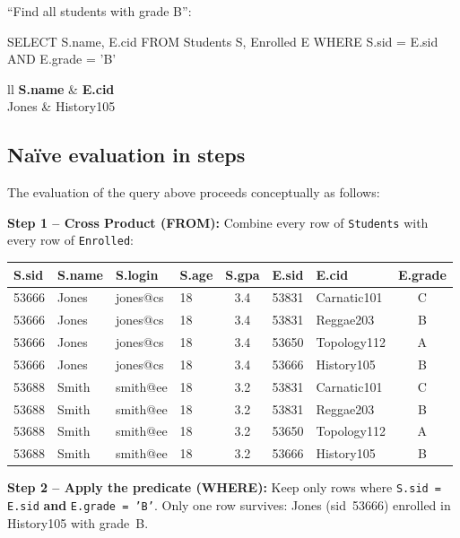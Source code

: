 \documentclass[../../dis.tex]{subfiles}
\begin{document}
``Find all students with grade B'':
\begin{sql}
    SELECT S.name, E.cid
    FROM Students S, Enrolled E
    WHERE S.sid = E.sid AND E.grade = 'B'
\end{sql}

\begin{dbtable}{}{ll}
\textbf{S.name} & \textbf{E.cid} \\ \hline
Jones & History105 \\
\end{dbtable}

\subsection{Na\"ive evaluation in steps}
The evaluation of the query above proceeds conceptually as follows:

\textbf{Step 1 -- Cross Product (FROM):}
Combine every row of \texttt{Students} with every row of \texttt{Enrolled}:

\begin{center}
\scriptsize
\begin{tabular}{|l|l|l|l|c|l|l|c|}
\hline
\rowcolor{DBHeaderBg}
\textbf{S.sid} & \textbf{S.name} & \textbf{S.login} & \textbf{S.age} & \textbf{S.gpa} & \textbf{E.sid} & \textbf{E.cid} & \textbf{E.grade} \\ \hline
53666 & Jones & jones@cs & 18 & 3.4 & 53831 & Carnatic101 & C \\ \hline
53666 & Jones & jones@cs & 18 & 3.4 & 53831 & Reggae203 & B \\ \hline
53666 & Jones & jones@cs & 18 & 3.4 & 53650 & Topology112 & A \\ \hline
53666 & Jones & jones@cs & 18 & 3.4 & 53666 & History105 & B \\ \hline
53688 & Smith & smith@ee & 18 & 3.2 & 53831 & Carnatic101 & C \\ \hline
53688 & Smith & smith@ee & 18 & 3.2 & 53831 & Reggae203 & B \\ \hline
53688 & Smith & smith@ee & 18 & 3.2 & 53650 & Topology112 & A \\ \hline
53688 & Smith & smith@ee & 18 & 3.2 & 53666 & History105 & B \\ \hline
\end{tabular}
\normalsize
\end{center}

\textbf{Step 2 -- Apply the predicate (WHERE):}
Keep only rows where \texttt{S.sid = E.sid} \textbf{and} \texttt{E.grade = 'B'}. Only one row survives: Jones (sid~53666) enrolled in History105 with grade~B.
\end{document}
